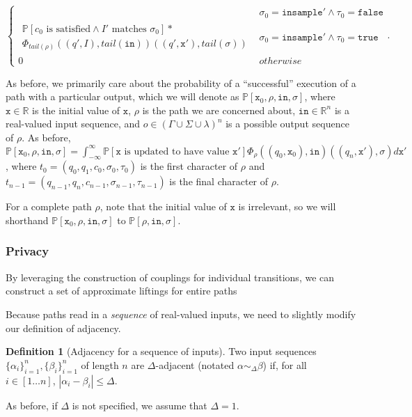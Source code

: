 \documentclass[12pt]{article}
\newcommand{\RR}{\mathbb{R}}
\newcommand{\PP}{\mathbb{P}}
\theoremstyle{definition}
\newtheorem{defn}[thm]{Definition}
\begin{document}
\[\begin{cases}
\begin{gathered}
        \end{gathered} & \sigma_0 = \texttt{insample}'\land \tau_0 = \texttt{false}\\[15pt]
        \begin{gathered}
            \PP[c_0\text{ is satisfied}\land I' \text{ matches }\sigma_0]*\\
            \Phi_{tail(\rho)}((q',I), tail(\texttt{in}))((q', \texttt{x}'), tail(\sigma))
        \end{gathered} & \sigma_0 = \texttt{insample}'\land\tau_0 = \texttt{true}\\[15pt]
        0 & otherwise
    \end{cases}.
\]

As before, we primarily care about the probability of a ``successful'' execution of a path with a particular output, which we will denote as $\PP[\texttt{x}_0, \rho, \texttt{in}, \sigma]$, where $\texttt{x} \in \RR$ is the initial value of $\texttt{x}$, $\rho$ is the path we are concerned about, $\texttt{in}\in \RR^n$ is a real-valued input sequence, and $o\in (\Gamma\cup\Sigma\cup\lambda)^n$ is a possible output sequence of $\rho$. 
As before, $\PP[\texttt{x}_0, \rho, \texttt{in}, \sigma] =\int_{-\infty}^{\infty} \PP[\texttt{x}\text{ is updated to have value }\texttt{x}']\Phi_\rho((q_0, \texttt{x}_0), \texttt{in})((q_n, \texttt{x}'), \sigma)d\texttt{x}'$, where $t_0 = (q_0, q_1, c_0, \sigma_0, \tau_0)$ is the first character of $\rho$ and $t_{n-1} = (q_{n-1}, q_n, c_{n-1}, \sigma_{n-1}, \tau_{n-1})$ is the final character of $\rho$.

For a complete path $\rho$, note that the initial value of $\texttt{x}$ is irrelevant, so we will shorthand $\PP[\texttt{x}_0, \rho, \texttt{in}, \sigma]$ to $\PP[\rho, \texttt{in}, \sigma]$.


\subsubsection{Privacy}

By leveraging the construction of couplings for individual transitions, we can construct a set of approximate liftings for entire paths 

Because paths read in a \textit{sequence} of real-valued inputs, we need to slightly modify our definition of adjacency.

\begin{defn}[Adjacency for a sequence of inputs]
    Two input sequences $\{\alpha_i\}_{i=1}^n, \{\beta_i\}_{i=1}^n$ of length $n$ are $\Delta$-adjacent (notated $\alpha \sim_{\Delta}\beta$) if, for all $i\in [1\ldots n]$, $|\alpha_i-\beta_i|\leq \Delta$. 

    As before, if $\Delta$ is not specified, we assume that $\Delta = 1$. 
\end{defn}
\end{document}
